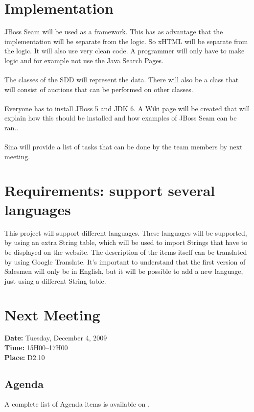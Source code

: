 \documentclass[a4paper, 12pt]{article}
\begin{document}
	\section{Implementation}
JBoss Seam will be used as a framework. This has as advantage that the implementation will be separate from the logic. So xHTML will be separate from the logic. It will also use very clean code. A programmer will only have to make logic and for example not use the Java Search Pages. \\ \\
The classes of the SDD will represent the data. There will also be a class that will consist of auctions that can be performed on other classes. \\ \\
Everyone has to install JBoss 5 and JDK 6. A Wiki page will be created that will explain how this should be installed and how examples of JBoss Seam can be ran.\cite{site2}. \\ \\
Sina will provide a list of tasks that can be done by the team members by next meeting.

	\section{Requirements: support several languages}
This project will support different languages. These languages will be supported, by using an extra String table, which will be used to import Strings that have to be displayed on the website. The description of the items itself can be translated by using Google Translate. It's important to understand that the first version of Salesmen will only be in English, but it will be possible to add a new language, just using a different String table.
	
	\section{Next Meeting}

		\textbf{Date:} Tuesday, December 4, 2009\\
		\textbf{Time:} 15H00--17H00\\
		\textbf{Place:} D2.10\\
	
		\subsection{Agenda}
A complete list of Agenda items is available on \cite{site6}.\\
	
\end{document}
